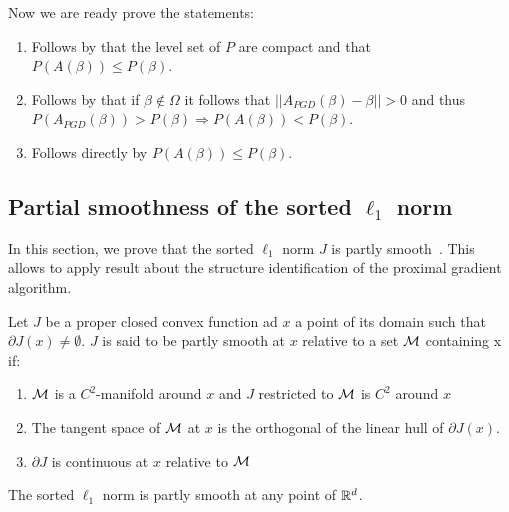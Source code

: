 Now we are ready prove the statements:
\begin{enumerate}
\item Follows by that the level set of $P$ are compact and that $P(A(\beta)) \leq P(\beta)$.
\item Follows by that if  $\beta \notin \Omega$ it follows that $||A_{PGD}(\beta) - \beta||>0$ and thus $P(A_{PGD}(\beta)) > P(\beta) \Rightarrow P(A(\beta)) < 
P(\beta)$.
\item Follows directly by $P(A(\beta)) \leq P(\beta)$.
\end{enumerate}

\subsection{Partial smoothness of the sorted $\ell_1$ norm}
\label{app:sec:partly_smooth}
In this section, we prove that the sorted $\ell_1$ norm $J$ is partly smooth~\parencite{lewis2002a}.
This allows to apply result about the structure identification of the proximal gradient algorithm.

\begin{definition}
  Let $J$ be a proper closed convex function ad $x$ a point of its domain such that $\partial J(x) \neq \emptyset$.
  $J$ is said to be partly smooth at $x$ relative to a set $\mathcal{M}$ containing x if:
  \begin{enumerate}
    \item $\mathcal{M}$ is a $C^2$-manifold around $x$ and $J$ restricted to $\mathcal{M}$ is $C^2$ around $x$
    \item The tangent space of $\mathcal{M}$ at $x$ is the orthogonal of the linear hull of $\partial J(x)$.
    \item $\partial J$ is continuous at $x$ relative to $\mathcal{M}$
  \end{enumerate}
\end{definition}

\begin{proposition}
  The sorted $\ell_1$ norm is partly smooth at any point of $\mathbb{R}^d$.
\end{proposition}

